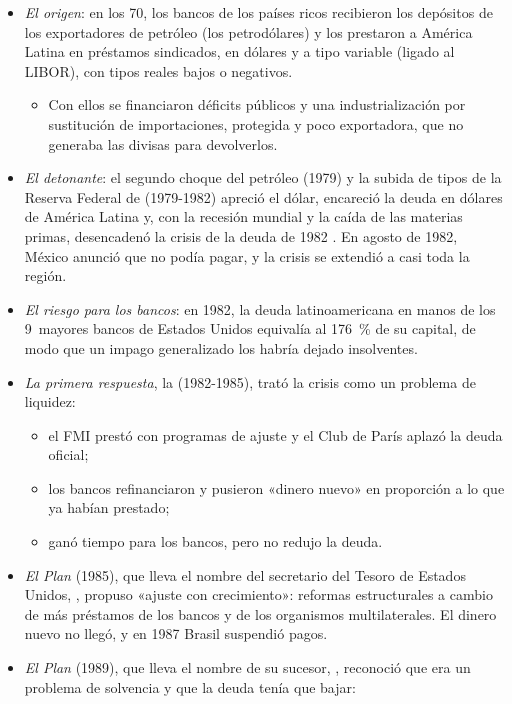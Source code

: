 \documentclass[11pt]{article}
\begin{document}
\begin{itemize}
\item \emph{El origen}: en los 70, los bancos de los países ricos recibieron los depósitos de los exportadores de petróleo (los petrodólares) y los prestaron a América Latina en préstamos sindicados, en dólares y a tipo variable (ligado al LIBOR), con tipos reales bajos o negativos.
  \begin{itemize}
  \item Con ellos se financiaron déficits públicos y una industrialización por sustitución de importaciones, protegida y poco exportadora, que no generaba las divisas para devolverlos.
  \end{itemize}
\item \emph{El detonante}: el segundo choque del petróleo (1979) y la subida de tipos de la Reserva Federal de  (1979-1982) apreció el dólar, encareció la deuda en dólares de América Latina y, con la recesión mundial y la caída de las materias primas, desencadenó la crisis de la deuda de 1982 . En agosto de 1982, México anunció que no podía pagar, y la crisis se extendió a casi toda la región.
\item \emph{El riesgo para los bancos}: en 1982, la deuda latinoamericana en manos de los 9~mayores bancos de Estados Unidos equivalía al 176~\% de su capital, de modo que un impago generalizado los habría dejado insolventes\nocite{SimsRomero2013LatAm}.
\item \emph{La primera respuesta}, la  (1982-1985), trató la crisis como un problema de liquidez:
  \begin{itemize}
  \item el FMI prestó con programas de ajuste y el Club de París aplazó la deuda oficial;
  \item los bancos refinanciaron y pusieron «dinero nuevo» en proporción a lo que ya habían prestado;
  \item ganó tiempo para los bancos, pero no redujo la deuda.
  \end{itemize}
\item \emph{El Plan } (1985), que lleva el nombre del secretario del Tesoro de Estados Unidos, , propuso «ajuste con crecimiento»: reformas estructurales a cambio de más préstamos de los bancos y de los organismos multilaterales. El dinero nuevo no llegó, y en 1987 Brasil suspendió pagos.
\item \emph{El Plan } (1989), que lleva el nombre de su sucesor, , reconoció que era un problema de solvencia y que la deuda tenía que bajar:

\end{itemize}
\end{document}
